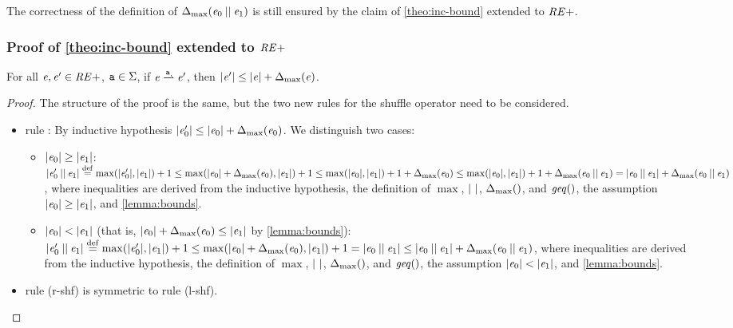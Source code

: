 The correctness of the definition of ${\Delta_{\max}}({\mathit {e}_0\mathbin{||}\mathit {e}_1})$ is still ensured by the claim of \cref{theo:inc-bound} extended to $\mathit {RE+}$.

\subsubsection*{Proof of \cref{theo:inc-bound} extended to $\mathit {RE+}$
}
For all $\mathit {e},\mathit {e}'\in\mathit {RE+}$, $\mathtt {a}\in\Sigma$, if $\re\parDer{\sym}\re'$, then ${\mid}{\mathit {e}'}{\mid}\leq {\mid}{\ensuremath{\mathit {e}}}{\mid}+{\Delta_{\max}}({\mathit {e}})$.

\begin{proof}
 The structure of the proof is the same, but the two new rules for the shuffle operator need to be considered.
 \begin{itemize}
  \item %
        rule : By inductive hypothesis ${\mid}{\mathit {e}_0'}{\mid}\leq {\mid}{\ensuremath{\mathit {e}}_0}{\mid}+{\Delta_{\max}}({\mathit {e}_0})$.
        We distinguish two cases:
        \begin{itemize}
         \item ${\mid}{\mathit {e}_0}{\mid}\geq{\mid}{\ensuremath{\mathit {e}}_1}{\mid}$:
               ${\mid}{\mathit {e}_0'\mathbin{||}\mathit {e}_1}{\mid}\stackrel{\mathrm{def}}{=}\max({\mid}{\mathit {e}'_0}{\mid},{\mid}{\mathit {e}_1}{\mid})+1\leq\max({\mid}{\mathit {e}_0}{\mid}+{\Delta_{\max}}({\mathit {e}_0}),{\mid}{\mathit {e}_1}{\mid})+1\leq\max({\mid}{\mathit {e}_0}{\mid},{\mid}{\mathit {e}_1}{\mid})+1+{\Delta_{\max}}({\mathit {e}_0})\leq\max({\mid}{\mathit {e}_0}{\mid},{\mid}{\mathit {e}_1}{\mid})+1+{\Delta_{\max}}({\mathit {e}_0\mathbin{||}\mathit {e}_1})={\mid}{\mathit {e}_0\mathbin{||}\mathit {e}_1}{\mid}+{\Delta_{\max}}({\mathit {e}_0\mathbin{||}\mathit {e}_1})$, where inequalities are derived from the inductive hypothesis, the definition of $\max$, ${\mid}{\ }{\mid}$, ${\Delta_{\max}}({})$, and $\mathit{geq}()$, the assumption ${\mid}{\mathit {e}_0}{\mid}\geq{\mid}{\ensuremath{\mathit {e}}_1}{\mid}$, and \cref{lemma:bounds}.

         \item ${\mid}{\mathit {e}_0}{\mid}<{\mid}{\mathit {e}_1}{\mid}$ (that is, ${\mid}{\mathit {e}_0}{\mid}+{\Delta_{\max}}({\mathit {e}_0})\leq{\mid}{\ensuremath{\mathit {e}}_1}{\mid}$ by \cref{lemma:bounds}):
               ${\mid}{\mathit {e}_0'\mathbin{||}\mathit {e}_1}{\mid}\stackrel{\mathrm{def}}{=}\max({\mid}{\mathit {e}'_0}{\mid},{\mid}{\mathit {e}_1}{\mid})+1\leq\max({\mid}{\mathit {e}_0}{\mid}+{\Delta_{\max}}({\mathit {e}_0}),{\mid}{\mathit {e}_1}{\mid})+1={\mid}{\mathit {e}_0\mathbin{||}\mathit {e}_1}{\mid}\leq{\mid}{\ensuremath{\mathit {e}}_0\mathbin{||}\ensuremath{\mathit {e}}_1}{\mid}+{\Delta_{\max}}({\mathit {e}_0\mathbin{||}\mathit {e}_1})$, where inequalities are derived from the inductive hypothesis, the definition of $\max$, ${\mid}{\ }{\mid}$, ${\Delta_{\max}}({})$, and $\mathit{geq}()$, the assumption ${\mid}{\mathit {e}_0}{\mid}<{\mid}{\mathit {e}_1}{\mid}$, and \cref{lemma:bounds}.
        \end{itemize}
  \item rule (r-shf) is symmetric to rule (l-shf).
 \end{itemize}
\end{proof}

